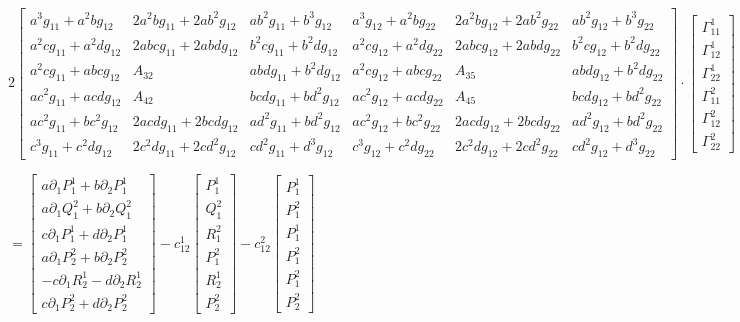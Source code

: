 \documentclass[10pt,a4paper]{article}
\begin{document}
		$2 \left[ \begin{matrix} a^3 g_{11} + a^2b g_{12} & 2a^2b g_{11} + 2ab^2 g_{12} & ab^2 g_{11} + b^3 g_{12} & a^3 g_{12} + a^2b g_{22} & 2a^2b g_{12} + 2ab^2 g_{22} & ab^2 g_{12} + b^3 g_{22} \\ a^2 c g_{11} + a^2 d g_{12} & 2abc g_{11} + 2abd g_{12} & b^2c g_{11} + b^2d g_{12} & a^2c g_{12} + a^2d g_{22} & 2abc g_{12} + 2abd g_{22} & b^2c g_{12} + b^2d g_{22} \\ a^2c g_{11} + abc g_{12} & A_{32} & abd g_{11} + b^2d g_{12} & a^2c g_{12} + abc g_{22} & A_{35} & abd g_{12} + b^2d g_{22} \\ ac^2 g_{11} + acd g_{12} & A_{42} & bcd g_{11} + bd^2 g_{12} & ac^2 g_{12} + acd g_{22} & A_{45} & bcd g_{12} + bd^2 g_{22} \\ ac^2 g_{11} + bc^2 g_{12} & 2acd g_{11} + 2bcd g_{12}  & ad^2 g_{11} + bd^2 g_{12} & ac^2 g_{12} + bc^2 g_{22} & 2acd g_{12} + 2bcd g_{22} & ad^2 g_{12} + bd^2 g_{22} \\ c^3 g_{11} + c^2d g_{12} & 2c^2d g_{11} + 2cd^2 g_{12} & cd^2 g_{11} + d^3 g_{12} & c^3 g_{12} + c^2d g_{22} & 2c^2d g_{12} + 2cd^2 g_{22} & cd^2 g_{12} + d^3 g_{22} \end{matrix} \right]\cdot \left[ \begin{matrix} \Gamma_{11}^1 \\ \Gamma_{12}^1 \\ \Gamma_{22}^1 \\ \Gamma_{11}^2 \\ \Gamma_{12}^2 \\ \Gamma_{22}^2 \end{matrix} \right]$

		$= \left[ \begin{matrix} a \partial_1 P_1^1 + b \partial_2 P_1^1 \\ a \partial_1 Q_1^2 + b \partial_2 Q_1^2 \\ c \partial_1 P_1^1 + d \partial_2 P_1^1  \\ a \partial_1 P_2^2 + b\partial_2 P_2^2 \\ -c \partial_1 R_2^1 - d\partial_2 R_2^1  \\ c \partial_1 P_2^2 + d\partial_2 P_2^2 \end{matrix} \right] - c_{12}^1 \left[ \begin{matrix} P_1^1 \\ Q_1^2 \\ R_1^2  \\ P_1^2  \\ R_2^1 \\ P_2^2 \end{matrix} \right] - c_{12}^2 \left[ \begin{matrix}  P_1^1 \\ P_1^2 \\ P_1^1 \\ P_1^2 \\ P_1^2 \\ P_2^2 \end{matrix} \right]$
\end{document}
